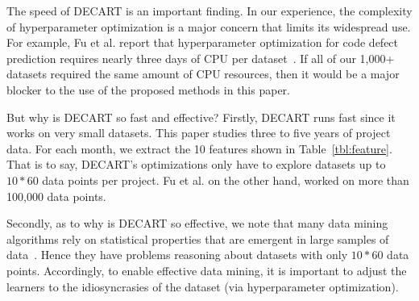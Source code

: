 \documentclass[smallextended]{svjour3}
\begin{document}
The speed of DECART is an important finding. 
In our experience, the complexity of hyperparameter optimization is a major concern that limits its widespread use.   For example, Fu et al. report that hyperparameter optimization for
code defect prediction requires nearly three days of CPU per dataset~\cite{Fu2016TuningFS}.
If all of our 1,000+ datasets required the same amount of CPU resources, then it would be a major blocker to the use of the proposed methods in this paper.

But why is DECART so fast and effective?
Firstly,  DECART runs fast since it works on   very small datasets. 
This paper studies three to five years of project data. For each month, we  extract the 10 features shown in  Table~\ref{tbl:feature}. That is to say,  DECART's optimizations only have to explore datasets up to $\mathit{10*60}$
 data points per project.
  Fu et al. on the other hand, worked on more than 100,000 data points.
 
 
Secondly, as to why is DECART so effective, we note that many data mining algorithms  rely on  statistical properties that are emergent in   large samples of data~\cite{witten11}. Hence they  
have problems reasoning about  datasets with only $\mathit{10*60}$ data points.  
Accordingly, to enable effective data mining,
it is important to adjust the learners to the   idiosyncrasies of the dataset 
(via hyperparameter optimization).
 
\end{document}
